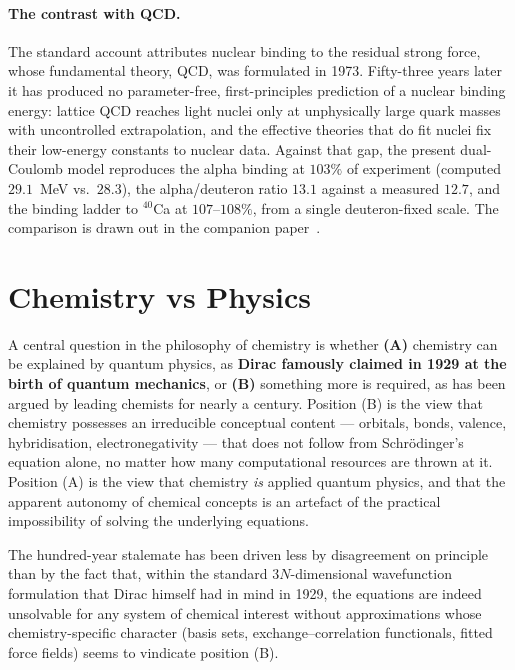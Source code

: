 \documentclass[11pt]{article}
\begin{document}
\paragraph{The contrast with QCD.}
The standard account attributes nuclear binding to the residual strong force, whose fundamental theory,
QCD, was formulated in 1973. Fifty-three years later it has produced no parameter-free, first-principles
prediction of a nuclear binding energy: lattice QCD reaches light nuclei only at unphysically large
quark masses with uncontrolled extrapolation, and the effective theories that do fit nuclei fix their
low-energy constants to nuclear data. Against that gap, the present dual-Coulomb model reproduces the
alpha binding at $103\%$ of experiment (computed $29.1$~MeV vs.\ $28.3$), the alpha/deuteron ratio
$13.1$ against a measured $12.7$, and the binding ladder to ${}^{40}$Ca at $107$--$108\%$, from a single
deuteron-fixed scale. The comparison is drawn out in the companion paper~\cite{QCDBinding}.

\section{Chemistry vs Physics}\label{sec:chemvphys}

A central question in the philosophy of chemistry is whether \textbf{(A)} chemistry can be explained by quantum physics, as \textbf{Dirac famously claimed in 1929 at the birth of quantum mechanics}, or \textbf{(B)} something more is required, as has been argued by leading chemists for nearly a century. Position (B) is the view that chemistry possesses an irreducible conceptual content --- orbitals, bonds, valence, hybridisation, electronegativity --- that does not follow from Schr\"odinger's equation alone, no matter how many computational resources are thrown at it. Position (A) is the view that chemistry \emph{is} applied quantum physics, and that the apparent autonomy of chemical concepts is an artefact of the practical impossibility of solving the underlying equations.

The hundred-year stalemate has been driven less by disagreement on principle than by the fact that, within the standard $3N$-dimensional wavefunction formulation that Dirac himself had in mind in 1929, the equations are indeed unsolvable for any system of chemical interest without approximations whose chemistry-specific character (basis sets, exchange--correlation functionals, fitted force fields) seems to vindicate position (B).
\end{document}
